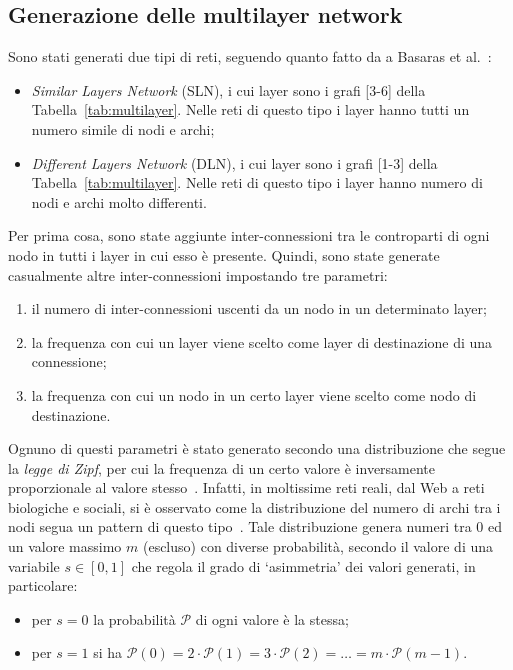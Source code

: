\subsection{Generazione delle multilayer network}

Sono stati generati due tipi di reti, seguendo quanto fatto da a Basaras et al.~\cite{basaras:infspmul}:
\begin{itemize}
    \item \emph{Similar Layers Network} (SLN), i cui layer sono i grafi [3-6] della  
            Tabella~\vref{tab:multilayer}. Nelle reti di questo tipo i layer hanno tutti un numero simile 
            di nodi e archi;
    \item \emph{Different Layers Network} (DLN), i cui layer sono i grafi [1-3] della 
        Tabella~\ref{tab:multilayer}. Nelle reti di questo tipo i layer hanno numero di nodi e archi molto differenti.
\end{itemize}


Per prima cosa, sono state aggiunte inter-connessioni tra le controparti di ogni nodo in tutti 
i layer in cui esso è presente.
Quindi, sono state generate casualmente altre inter-connessioni impostando tre parametri:
\begin{enumerate}
    \item il numero di inter-connessioni uscenti da un nodo in un determinato layer;
    \item la frequenza con cui un layer viene scelto come layer di destinazione di 
        una connessione;
    \item la frequenza con cui un nodo in un certo layer viene scelto come nodo 
        di destinazione. 
\end{enumerate}
Ognuno di questi parametri è stato generato secondo una distribuzione che segue 
la \emph{legge di Zipf}, per cui la frequenza di un certo valore è inversamente
proporzionale al valore stesso~\cite{zipf:humanb}. Infatti, in moltissime reti reali,
dal Web a reti biologiche e sociali, si è osservato come la distribuzione del 
numero di archi tra i nodi segua un pattern di questo tipo~\cite{barabasi:scale}.
Tale distribuzione genera numeri tra 0 ed un valore massimo $m$ (escluso) con diverse probabilità,
secondo il valore di una variabile $s \in [0, 1]$
che regola il grado di `asimmetria' dei valori generati, in particolare:
\begin{itemize}
    \item per $s=0$ la probabilità $\mathcal{P}$ di ogni valore è la stessa;  
    \item per $s=1$ si ha $\mathcal{P}(0) = 2 \cdot \mathcal{P}(1) = 3 \cdot \mathcal{P}(2) =\dots = m \cdot \mathcal{P}(m-1)$. 
\end{itemize}

